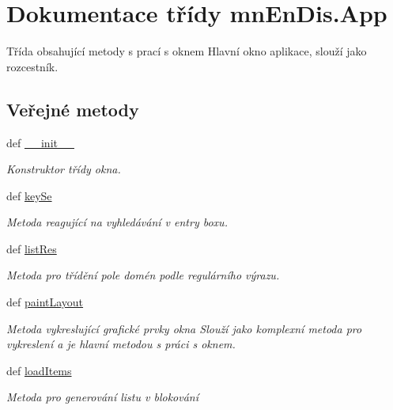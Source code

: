 \hypertarget{classmnEnDis_1_1App}{\section{Dokumentace třídy mn\-En\-Dis.\-App}
\label{d3/d4e/classmnEnDis_1_1App}
}


Třída obsahující metody s prací s oknem Hlavní okno aplikace, slouží jako rozcestník.  


\subsection*{Veřejné metody}
\begin{DoxyCompactItemize}
\item 
def \hyperlink{classmnEnDis_1_1App_a3ac75ba1fca4a08b0d67aa7e90955432}{\-\_\-\-\_\-init\-\_\-\-\_\-}
\begin{DoxyCompactList}\small\item\em Konstruktor třídy okna. \end{DoxyCompactList}\item 
def \hyperlink{classmnEnDis_1_1App_af13efa3169ba4793cf1b89047a6badb4}{key\-Se}
\begin{DoxyCompactList}\small\item\em Metoda reagující na vyhledávání v entry boxu. \end{DoxyCompactList}\item 
def \hyperlink{classmnEnDis_1_1App_ac43efb517d5669730e3fc10b0fb3fda0}{list\-Res}
\begin{DoxyCompactList}\small\item\em Metoda pro třídění pole domén podle regulárního výrazu. \end{DoxyCompactList}\item 
def \hyperlink{classmnEnDis_1_1App_a93d7d009d63cf2e43b27e518a6c13a34}{paint\-Layout}
\begin{DoxyCompactList}\small\item\em Metoda vykreslující grafické prvky okna Slouží jako komplexní metoda pro vykreslení a je hlavní metodou s práci s oknem. \end{DoxyCompactList}\item 
def \hyperlink{classmnEnDis_1_1App_a8ad51ad767ffedec6efb20f08edf0c15}{load\-Items}
\begin{DoxyCompactList}\small\item\em Metoda pro generování listu v blokování \end{DoxyCompactList}\item 

\end{DoxyCompactItemize}
